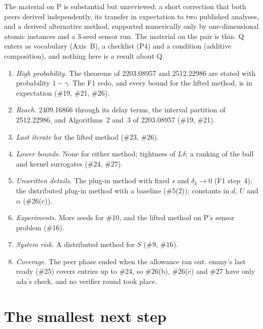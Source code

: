 \documentclass{article}
\begin{document}
The material on P is substantial but unreviewed: a short correction that
both peers derived independently, its transfer in expectation to two
published analyses, and a derived alternative method, supported
numerically only by one-dimensional atomic instances and a 3-seed sensor
run. The material on the pair is thin. Q enters as vocabulary (Axis~B), a
checklist (P4) and a condition (additive composition), and nothing here is
a result about Q.
\begin{enumerate}
\item \emph{High probability.} The theorems of 2203.08957 and 2512.22986
are stated with probability $1-\gamma$. The F1 redo, and every bound for
the lifted method, is in expectation (\#19, \#21, \#26).
\item \emph{Reach.} 2409.16866 through its delay terms, the interval
partition of 2512.22986, and Algorithms~2 and~3 of 2203.08957 (\#19,
\#21).
\item \emph{Last iterate} for the lifted method (\#23, \#26).
\item \emph{Lower bounds.} None for either method; tightness of
$L\delta$; a ranking of the ball and kernel surrogates (\#24, \#27).
\item \emph{Unwritten details.} The plug-in method with fixed $s$ and
$\delta_k\to0$ (F1 step~4); the distributed plug-in method with a
baseline (\#5(2)); constants in $d$, $U$ and $\alpha$ (\#26(c)).
\item \emph{Experiments.} More seeds for \#10, and the lifted method on
P's sensor problem (\#16).
\item \emph{System risk.} A distributed method for $S$ (\#9, \#16).
\item \emph{Coverage.} The peer phase ended when the allowance ran out.
emmy's last ready (\#25) covers entries up to \#24, so \#26(b), \#26(c)
and \#27 have only ada's check, and no verifier round took place.
\end{enumerate}

\section{The smallest next step}\label{sec:next}
\end{document}
